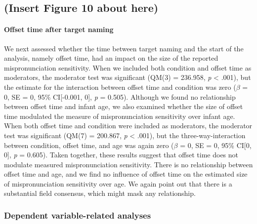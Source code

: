 \documentclass[man]{apa6}
\let\oldparagraph\paragraph
\renewcommand{\paragraph}[1]{\oldparagraph{#1}\mbox{}}
\begin{document}
\hypertarget{insert-figure-10-about-here}{%
\subsection{(Insert Figure 10 about here)}\label{insert-figure-10-about-here}}

\hypertarget{offset-time-after-target-naming}{%
\paragraph{Offset time after target naming}\label{offset-time-after-target-naming}}

We next assessed whether the time between target naming and the start of the analysis, namely offset time, had an impact on the size of the reported mispronunciation sensitivity. When we included both condition and offset time as moderators, the moderator test was significant (QM(3) = 236.958, \emph{p} \textless{} .001), but the estimate for the interaction between offset time and condition was zero (\(\beta\) = 0, SE = 0, 95\% CI{[}-0.001, 0{]}, \emph{p} = 0.505). Although we found no relationship between offset time and infant age, we also examined whether the size of offset time modulated the measure of mispronunciation sensitivity over infant age. When both offset time and condition were included as moderators, the moderator test was significant (QM(7) = 200.867, \emph{p} \textless{} .001), but the three-way-interaction between condition, offset time, and age was again zero (\(\beta\) = 0, SE = 0, 95\% CI{[}0, 0{]}, \emph{p} = 0.605). Taken together, these results suggest that offset time does not modulate measured mispronunciation sensitivity. There is no relationship between offset time and age, and we find no influence of offset time on the estimated size of mispronunciation sensitivity over age. We again point out that there is a substantial field consensus, which might mask any relationship.

\hypertarget{dependent-variable-related-analyses}{%
\subsubsection{Dependent variable-related analyses}\label{dependent-variable-related-analyses}}
\end{document}

